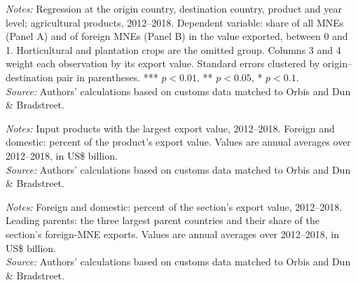 \documentclass[11pt,a4paper]{article}
\newcommand{\srcnote}{\textit{Source:} Authors' calculations based on customs data matched to Orbis and Dun \& Bradstreet.}
\begin{document}
\begin{table}[H]\centering\small%
  \caption{Multinational Share of Agricultural Exports, by Type of Production: Regressions}%
  \label{tab:ap_crop_share}%
  \par\vspace{3pt}%
  \begin{minipage}{0.95\textwidth}\footnotesize %
  \textit{Notes:} Regression at the origin country, destination country, product and year level; agricultural products, 2012--2018. Dependent variable: share of all MNEs (Panel A) and of foreign MNEs (Panel B) in the value exported, between 0 and 1. Horticultural and plantation crops are the omitted group. Columns 3 and 4 weight each observation by its export value. Standard errors clustered by origin--destination pair in parentheses. *** $p<0.01$, ** $p<0.05$, * $p<0.1$.\\[3pt]%
  \srcnote%
  \end{minipage}%
  \end{table}
\begin{table}[H]\centering\footnotesize%
  \caption{Largest Agricultural Input Products}%
  \label{tab:ap_topinputs}%
  \par\vspace{3pt}%
  \begin{minipage}{0.95\textwidth}\footnotesize %
  \textit{Notes:} Input products with the largest export value, 2012--2018. Foreign and domestic: percent of the product's export value. Values are annual averages over 2012--2018, in US\$ billion.\\[3pt]%
  \srcnote%
  \end{minipage}%
  \end{table}
\begin{table}[H]\centering\footnotesize%
  \caption{Agricultural Exports and Multinational Shares, by HS Section}%
  \label{tab:ap_hssection}%
  \par\vspace{3pt}%
  \begin{minipage}{0.95\textwidth}\footnotesize %
  \textit{Notes:} Foreign and domestic: percent of the section's export value, 2012--2018. Leading parents: the three largest parent countries and their share of the section's foreign-MNE exports. Values are annual averages over 2012--2018, in US\$ billion.\\[3pt]%
  \srcnote%
  \end{minipage}%
  \end{table}
\end{document}
